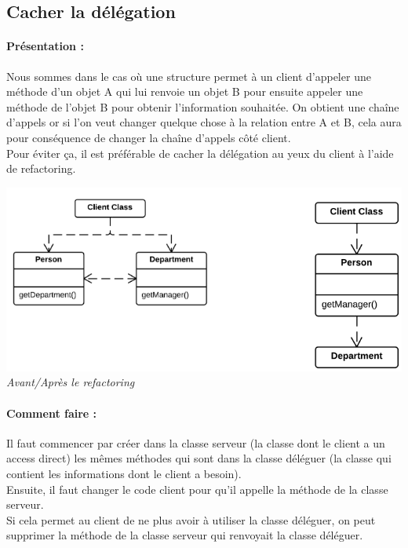 \documentclass[a4paper,twoside,12pt,openright]{report}
\begin{document}
\newpage

\subsection{Cacher la délégation}
\paragraph{Présentation :}
Nous sommes dans le cas où une structure permet à un client d'appeler une méthode d'un objet A qui lui renvoie un objet B pour ensuite appeler une méthode de l'objet B pour obtenir l'information souhaitée. On obtient une chaîne d'appels or si l'on veut changer quelque chose à la relation entre A et B, cela aura pour conséquence de changer la chaîne d'appels côté client.\\
Pour éviter ça, il est préférable de cacher la délégation au yeux du client à l'aide de refactoring.

\begin{center}
\includegraphics[scale=0.7]{Image/Cacher_Delegation.png}\\
\itshape{Avant/Après le refactoring \cite{ref5}}
\end{center}

\paragraph{Comment faire :}
Il faut commencer par créer dans la classe serveur (la classe dont le client a un access direct) les mêmes méthodes qui sont dans la classe déléguer (la classe qui contient les informations dont le client a besoin).\\
Ensuite, il faut changer le code client pour qu'il appelle la méthode de la classe serveur.\\
Si cela permet au client de ne plus avoir à utiliser la classe déléguer, on peut supprimer la méthode de la classe serveur qui renvoyait la classe déléguer.
\end{document}
